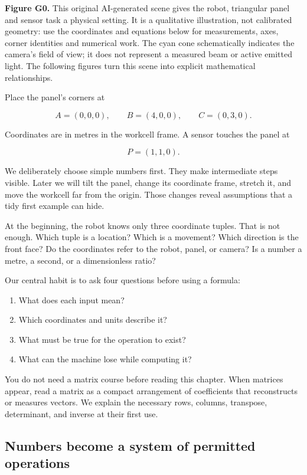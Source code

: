 \textbf{Figure G0.} This original AI-generated scene gives the robot, triangular panel and sensor task a physical setting. It is a qualitative illustration, not calibrated geometry: use the coordinates and equations below for measurements, axes, corner identities and numerical work. The cyan cone schematically indicates the camera's field of view; it does not represent a measured beam or active emitted light. The following figures turn this scene into explicit mathematical relationships.

Place the panel's corners at

\[
A=(0,0,0),\qquad B=(4,0,0),\qquad C=(0,3,0).
\]

Coordinates are in metres in the workcell frame. A sensor touches the panel at

\[
P=(1,1,0).
\]

We deliberately choose simple numbers first. They make intermediate steps visible. Later we will tilt the panel, change its coordinate frame, stretch it, and move the workcell far from the origin. Those changes reveal assumptions that a tidy first example can hide.

At the beginning, the robot knows only three coordinate tuples. That is not enough. Which tuple is a location? Which is a movement? Which direction is the front face? Do the coordinates refer to the robot, panel, or camera? Is a number a metre, a second, or a dimensionless ratio?

Our central habit is to ask four questions before using a formula:

\begin{enumerate}
\def\labelenumi{\arabic{enumi}.}
\tightlist
\item
  What does each input mean?
\item
  Which coordinates and units describe it?
\item
  What must be true for the operation to exist?
\item
  What can the machine lose while computing it?
\end{enumerate}

You do not need a matrix course before reading this chapter. When matrices appear, read a matrix as a compact arrangement of coefficients that reconstructs or measures vectors. We explain the necessary rows, columns, transpose, determinant, and inverse at their first use.

\subsection{Numbers become a system of permitted operations}\label{01-foundations-i-ch017-numbers-become-a-system-of-permitted-operations}

